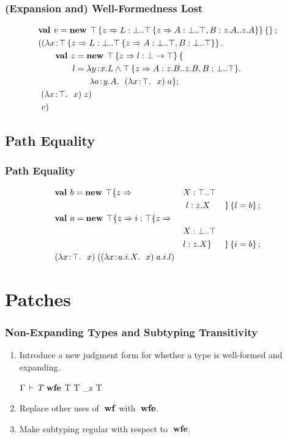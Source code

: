 \documentclass{beamer}
\begin{document}
\begin{frame}
\frametitle{(Expansion and) Well-Formedness Lost}
\begin{align*}
&\mlnew v {\Top \refine z {\Ldecl L \Bot {\Top \refine z {\Ldecl A \Bot \Top, \Ldecl B {z.A} {z.A}}}} \ldefs{}}{
\mlapp {\abs x {\Top \refine z {\Ldecl L \Bot {\Top \refine z {\Ldecl A \Bot \Top, \Ldecl B \Bot \Top}}}} {\\&\gap
\mlnew z {\Top \refine z {\ldecl l {\Bot \tfun \Top}}\mlldefs{\\&\gap\gap l = \abs y {x.L \tand {\Top \refine z {\Ldecl A {z.B} {z.B}, \Ldecl B \Bot \Top}}} {\\&\gap\gap\gap\abs a {y.A} {\app {(\abs x \Top x)} a}}}}{
\ \app {(\abs x \Top x)} z
}}}{\ v}}
\end{align*}
\end{frame}

\subsection{Path Equality}
\begin{frame}
\frametitle{Path Equality}
\begin{align*}
&\textbf{val }b = \textbf{new }\top \{z \Rightarrow &&X : \top..\top&\\
&&&\ l : z.X& \}\left\{l = b\right\} ;\;\\&
\textbf{val }a = \textbf{new }\top \{z \Rightarrow i : \top \{z \Rightarrow &&&\\
&&&X : \bot..\top\\
&&&l : z.X \}& \}\left\{i = b\right\} ;\;\\&
(\lambda x\!:\!\top.\ \ x)\;((\lambda x\!:\!a.i.X.\ \ x)\;a.i.l)
\end{align*}
\end{frame}

\section{Patches}

\begin{frame}
\frametitle{Non-Expanding Types and Subtyping Transitivity}
\begin{enumerate}
\item Introduce a new judgment form for whether a type is well-formed and expanding.
\begin{block}{$\Gamma \,\vdash\, T \;\mbox{\textbf{wfe}}$}
  \infrule
  {\Gamma \ts T \wf \spcomma T \expand_z }
  {\Gamma \ts T \wfe}
\end{block}
\item Replace other uses of $\;\mbox{\textbf{wf}}$ with $\;\mbox{\textbf{wfe}}$.
\item Make subtyping regular with respect to $\;\mbox{\textbf{wfe}}$.
\end{enumerate}
\end{frame}
\end{document}

